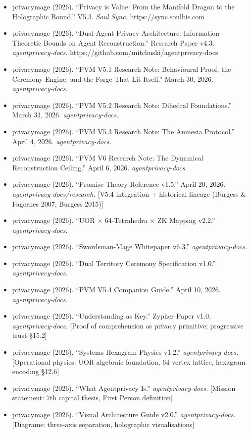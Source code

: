 \documentclass[
  11pt,
]{article}
\providecommand{\tightlist}{%
  \setlength{\itemsep}{0pt}\setlength{\parskip}{0pt}}
\begin{document}
\begin{itemize}
\tightlist
\item
  privacymage (2026). ``Privacy is Value: From the Manifold Dragon to
  the Holographic Bound.'' V5.3. \emph{Soul Sync.}
  https://sync.soulbis.com
\item
  privacymage (2026). ``Dual-Agent Privacy Architecture:
  Information-Theoretic Bounds on Agent Reconstruction.'' Research Paper
  v4.3. \emph{agentprivacy-docs.}
  https://github.com/mitchuski/agentprivacy-docs
\item
  privacymage (2026). ``PVM V5.1 Research Note: Behavioural Proof, the
  Ceremony Engine, and the Forge That Lit Itself.'' March 30, 2026.
  \emph{agentprivacy-docs.}
\item
  privacymage (2026). ``PVM V5.2 Research Note: Dihedral Foundations.''
  March 31, 2026. \emph{agentprivacy-docs.}
\item
  privacymage (2026). ``PVM V5.3 Research Note: The Amnesia Protocol.''
  April 4, 2026. \emph{agentprivacy-docs.}
\item
  privacymage (2026). ``PVM V6 Research Note: The Dynamical
  Reconstruction Ceiling.'' April 6, 2026. \emph{agentprivacy-docs.}
\item
  privacymage (2026). ``Promise Theory Reference v1.5.'' April 20, 2026.
  \emph{agentprivacy-docs/research.} {[}V5.4 integration + historical
  lineage (Burgess \& Fagernes 2007, Burgess 2015){]}
\item
  privacymage (2026). ``UOR × 64-Tetrahedra × ZK Mapping v2.2.''
  \emph{agentprivacy-docs.}
\item
  privacymage (2026). ``Swordsman-Mage Whitepaper v6.3.''
  \emph{agentprivacy-docs.}
\item
  privacymage (2026). ``Dual Territory Ceremony Specification v1.0.''
  \emph{agentprivacy-docs.}
\item
  privacymage (2026). ``PVM V5.4 Companion Guide.'' April 10, 2026.
  \emph{agentprivacy-docs.}
\item
  privacymage (2026). ``Understanding as Key.'' Zypher Paper v1.0.
  \emph{agentprivacy-docs.} {[}Proof of comprehension as privacy
  primitive; progressive trust §15.2{]}
\item
  privacymage (2026). ``Systems Hexagram Physics v1.2.''
  \emph{agentprivacy-docs.} {[}Operational physics: UOR algebraic
  foundation, 64-vertex lattice, hexagram encoding §12.6{]}
\item
  privacymage (2026). ``What Agentprivacy Is.''
  \emph{agentprivacy-docs.} {[}Mission statement: 7th capital thesis,
  First Person definition{]}
\item
  privacymage (2026). ``Visual Architecture Guide v2.0.''
  \emph{agentprivacy-docs.} {[}Diagrams: three-axis separation,
  holographic visualisations{]}
\end{itemize}
\end{document}
